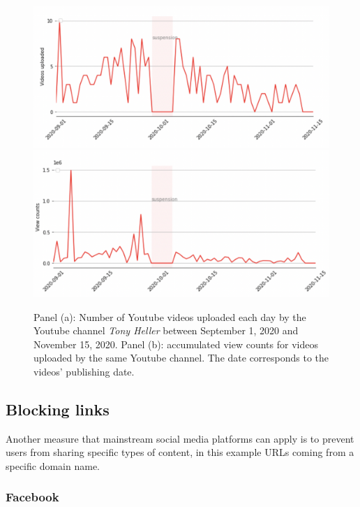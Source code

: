 \documentclass{article}
\begin{document}
\begin{figure}
	\centering
			\includegraphics[scale=0.25]{./img/tony/fig1_tony.png}
			\includegraphics[scale=0.25]{./img/tony/fig2_tony.png}
	\caption{Panel (a): Number of Youtube videos uploaded each day by the Youtube channel {\it Tony Heller} between September 1, 2020 and November 15, 2020. Panel (b): accumulated view counts for videos uploaded by the same Youtube channel. The date corresponds to the videos’  publishing date. 
}
	\label{fig1_tony}
\end{figure}

\subsection{Blocking links}

Another measure that mainstream social media platforms can apply is to prevent users from sharing specific types of content, in this example URLs coming from a specific domain name.

\subsubsection{Facebook}
\end{document}
